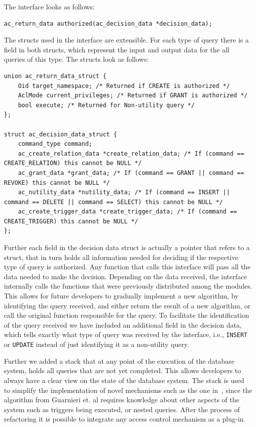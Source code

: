 The interface looks as follows:
%
\begin{lstlisting}[frame=single, style=customc]
ac_return_data authorized(ac_decision_data *decision_data);
\end{lstlisting}
%
The structs used in the interface are extensible. For each type of query there is a field in both structs, which represent the input and output data for the all queries of this type.
%
The structs look as follows:
\begin{lstlisting}[frame=single, style=customc]
union ac_return_data_struct {
	Oid target_namespace; /* Returned if CREATE is authorized */
	AclMode current_privileges; /* Returned if GRANT is authorized */
	bool execute; /* Returned for Non-utility query */
};

struct ac_decision_data_struct {
	command_type command;
	ac_create_relation_data *create_relation_data; /* If (command == CREATE_RELATION) this cannot be NULL */
	ac_grant_data *grant_data; /* If (command == GRANT || command == REVOKE) this cannot be NULL */
	ac_nutility_data *nutility_data; /* If (command == INSERT || command == DELETE || command == SELECT) this cannot be NULL */
	ac_create_trigger_data *create_trigger_data; /* If (command == CREATE_TRIGGER) this cannot be NULL */
};
\end{lstlisting}
%
Further each field in the decision data struct is actually a pointer that refers to a struct, that in turn holds all information needed for deciding if the respective type of query is authorized.
%
Any function that calls this interface will pass all the data needed to make the decision.
%
Depending on the data received, the interface internally calls the functions that were previously distributed among the modules.
%
This allows for future developers to gradually implement a new algorithm, by identifying the query received, and either return the result of a new algorithm, or call the original function responsible for the query.
%
To facilitate the identification of the query received we have included an additional field in the decision data, which tells exactly what type of query was received by the interface, i.e., \texttt{INSERT} or \texttt{UPDATE} instead of just identifying it as a non-utility query.

Further we added a stack that at any point of the execution of the database system, holds all queries that are not yet completed.
%
This allows developers to always have a clear view on the state of the database system.
%
The stack is used to simplify the implementation of novel mechanisms such as the one in~\cite{guarnieri2016strong}, since the algorithm from Guarnieri et. al requires knowledge about other aspects of the system such as triggers being executed, or nested queries.
%
After the process of refactoring it is possible to integrate any access control mechanism as a plug-in.